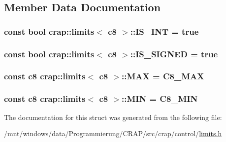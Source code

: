 \subsection{Member Data Documentation}
\hypertarget{structcrap_1_1limits_3_01c8_01_4_ae087ab07a112eab4e5f69286779f86b0}{
\subsubsection[{I\-S\-\_\-\-I\-N\-T}]{\setlength{\rightskip}{0pt plus 5cm}const bool {\bf crap\-::limits}$<$ {\bf c8} $>$\-::I\-S\-\_\-\-I\-N\-T = true\hspace{0.3cm}{\ttfamily [static]}}}\label{structcrap_1_1limits_3_01c8_01_4_ae087ab07a112eab4e5f69286779f86b0}
\hypertarget{structcrap_1_1limits_3_01c8_01_4_ae0dc730a91615cd843450f9ae8da1c4b}{
\subsubsection[{I\-S\-\_\-\-S\-I\-G\-N\-E\-D}]{\setlength{\rightskip}{0pt plus 5cm}const bool {\bf crap\-::limits}$<$ {\bf c8} $>$\-::I\-S\-\_\-\-S\-I\-G\-N\-E\-D = true\hspace{0.3cm}{\ttfamily [static]}}}\label{structcrap_1_1limits_3_01c8_01_4_ae0dc730a91615cd843450f9ae8da1c4b}
\hypertarget{structcrap_1_1limits_3_01c8_01_4_a97ae99a3786f3d5189299535e582bba8}{
\subsubsection[{M\-A\-X}]{\setlength{\rightskip}{0pt plus 5cm}const {\bf c8} {\bf crap\-::limits}$<$ {\bf c8} $>$\-::M\-A\-X = {\bf C8\-\_\-\-M\-A\-X}\hspace{0.3cm}{\ttfamily [static]}}}\label{structcrap_1_1limits_3_01c8_01_4_a97ae99a3786f3d5189299535e582bba8}
\hypertarget{structcrap_1_1limits_3_01c8_01_4_a7cbf9e8356893e0dab215fa806292eae}{
\subsubsection[{M\-I\-N}]{\setlength{\rightskip}{0pt plus 5cm}const {\bf c8} {\bf crap\-::limits}$<$ {\bf c8} $>$\-::M\-I\-N = {\bf C8\-\_\-\-M\-I\-N}\hspace{0.3cm}{\ttfamily [static]}}}\label{structcrap_1_1limits_3_01c8_01_4_a7cbf9e8356893e0dab215fa806292eae}


The documentation for this struct was generated from the following file\-:\begin{DoxyCompactItemize}
\item 
/mnt/windows/data/\-Programmierung/\-C\-R\-A\-P/src/crap/control/\hyperlink{limits_8h}{limits.\-h}\end{DoxyCompactItemize}
